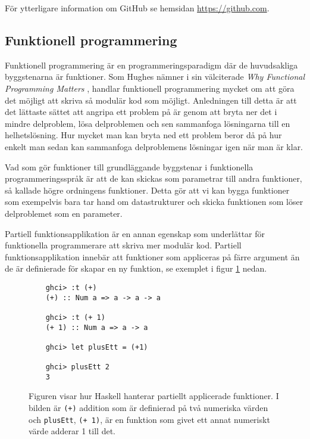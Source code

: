 \documentclass[12pt,a4paper,twoside,openright]{article}
\begin{document}
För ytterligare information om GitHub se hemsidan \url{https://github.com}.

\subsection{Funktionell programmering}
Funktionell programmering är en programmeringsparadigm där de
huvudsakliga byggstenarna är funktioner. Som Hughes nämner i sin
välciterade \textit{Why Functional Programming Matters}
\cite{hughes1989functional}, handlar funktionell programmering mycket
om att göra det möjligt att skriva så modulär kod som möjligt.
Anledningen till detta är att det lättaste sättet att angripa ett
problem på är genom att bryta ner det i mindre delproblem, lösa
delproblemen och sen sammanfoga lösningarna till en helhetslösning.
Hur mycket man kan bryta ned ett problem beror då på hur enkelt man
sedan kan sammanfoga delproblemens lösningar igen när man är klar.

Vad som gör funktioner till grundläggande byggstenar i funktionella
programmeringsspråk är att de kan skickas som parametrar till andra
funktioner, så kallade högre ordningens funktioner. Detta gör att vi
kan bygga funktioner som exempelvis bara tar hand om datastrukturer
och skicka funktionen som löser delproblemet som en parameter.

Partiell funktionsapplikation är en annan egenskap som underlättar för
funktionella programmerare att skriva mer modulär kod.  Partiell
funktionsapplikation innebär att funktioner som appliceras på färre
argument än de är definierade för skapar en ny funktion, se exemplet i
figur \ref{fig:hask_partfunapp} nedan.

\begin{figure}[H]
  \begin{verbatim}
    ghci> :t (+)
    (+) :: Num a => a -> a -> a

    ghci> :t (+ 1)
    (+ 1) :: Num a => a -> a

    ghci> let plusEtt = (+1)

    ghci> plusEtt 2
    3
  \end{verbatim}
  \caption{Figuren visar hur Haskell hanterar partiellt applicerade
    funktioner. I bilden är \texttt{(+)} addition som är
    definierad på två numeriska värden och
    \texttt{plusEtt}, \texttt{(+ 1)}, är en
    funktion som givet ett annat numeriskt värde adderar 1 till det.}
  \label{fig:hask_partfunapp}
\end{figure}
\end{document}
